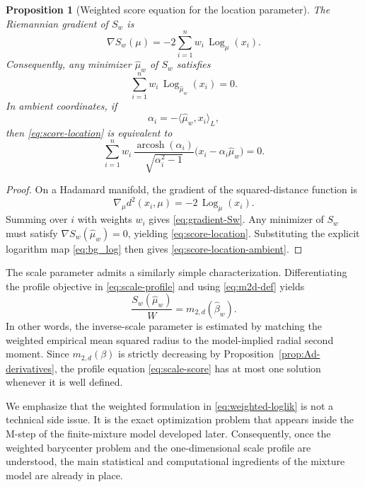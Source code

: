 \documentclass[11pt]{article}
\newtheorem{proposition}[theorem]{Proposition}
\begin{document}
\begin{proposition}[Weighted score equation for the location parameter]\label{prop:score-equation-location}
The Riemannian gradient of \(S_w\) is
\begin{equation}\label{eq:gradient-Sw}
\nabla S_w(\mu)
=
-2\sum_{i=1}^n w_i\,\operatorname{Log}_\mu(x_i).
\end{equation}
Consequently, any minimizer \(\hat{\mu}_w\) of \(S_w\) satisfies
\begin{equation}\label{eq:score-location}
\sum_{i=1}^n w_i\,\operatorname{Log}_{\hat{\mu}_w}(x_i)=0.
\end{equation}
In ambient coordinates, if
\begin{equation}\label{eq:alpha-i-hat}
\alpha_i=-\langle \hat{\mu}_w,x_i\rangle_L,
\end{equation}
then \eqref{eq:score-location} is equivalent to
\begin{equation}\label{eq:score-location-ambient}
\sum_{i=1}^n
w_i\,
\frac{\operatorname{arcosh}(\alpha_i)}{\sqrt{\alpha_i^2-1}}
\bigl(x_i-\alpha_i\hat{\mu}_w\bigr)
=
0.
\end{equation}
\end{proposition}

\begin{proof}
On a Hadamard manifold, the gradient of the squared-distance function is
\[
\nabla_\mu d^2(x_i,\mu)=-2\,\operatorname{Log}_\mu(x_i).
\]
Summing over \(i\) with weights \(w_i\) gives \eqref{eq:gradient-Sw}. Any minimizer of \(S_w\) must satisfy \(\nabla S_w(\hat{\mu}_w)=0\), yielding \eqref{eq:score-location}. Substituting the explicit logarithm map \eqref{eq:bg_log} then gives \eqref{eq:score-location-ambient}.
\end{proof}

The scale parameter admits a similarly simple characterization. Differentiating the profile objective in \eqref{eq:scale-profile} and using \eqref{eq:m2d-def} yields
\begin{equation}\label{eq:scale-score}
\frac{S_w(\hat{\mu}_w)}{W}=m_{2,d}(\hat{\beta}_w).
\end{equation}
In other words, the inverse-scale parameter is estimated by matching the weighted empirical mean squared radius to the model-implied radial second moment. Since \(m_{2,d}(\beta)\) is strictly decreasing by Proposition~\ref{prop:Ad-derivatives}, the profile equation \eqref{eq:scale-score} has at most one solution whenever it is well defined.

We emphasize that the weighted formulation in \eqref{eq:weighted-loglik} is not a technical side issue. It is the exact optimization problem that appears inside the M-step of the finite-mixture model developed later. Consequently, once the weighted barycenter problem and the one-dimensional scale profile are understood, the main statistical and computational ingredients of the mixture model are already in place.
\end{document}
